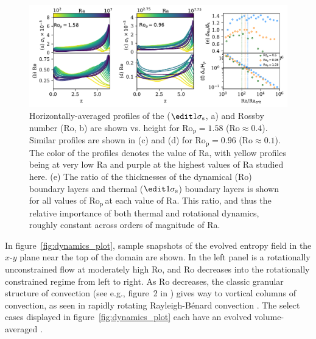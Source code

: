 \documentclass[twocolumn, amsmath, amsfonts, amssymb, trackchanges]{aastex62}
\newcommand{\RB}{Rayleigh-B\'{e}nard }
\newcommand{\pro}{\ensuremath{\text{Ro}_{\text{p}}}}
\begin{document}
\begin{figure}[ht!]
    \includegraphics[width=\textwidth]{boundary_layers.pdf}
    \caption{Horizontally-averaged profiles of the  ($\edit1{\sigma_{\text{s}}}$, a) and Rossby number (Ro, b) 
    are shown vs. height for $\pro = 1.58$ ($\text{Ro} \approx 0.4$). 
    Similar profiles are shown in (c) and (d) for $\pro = 0.96$ ($\text{Ro} \approx 0.1$). The color of the profiles
    denotes the value of Ra, with yellow profiles being at very low Ra and purple at the highest
    values of Ra studied here.
    (e) The ratio of the thicknesses of the dynamical (Ro) boundary layers and 
    thermal ($\edit1{\sigma_{\text{s}}}$) boundary layers is shown for all values of \pro$\,$at each value of Ra.
    This ratio, and thus the relative importance of both thermal and rotational dynamics,
	 roughly constant across orders of magnitude of Ra.
    \label{fig:profiles_and_bls} }
\end{figure}

In figure~\ref{fig:dynamics_plot}, sample snapshots
of the evolved entropy field in the $x$-$y$ plane near the top of the domain are shown. 
In the left panel is a rotationally unconstrained flow at moderately high
Ro, and Ro decreases into the rotationally constrained regime from left to right.
As Ro decreases, the
classic granular structure of convection (see e.g., figure~2 in \AB) gives way to vortical
columns of convection, as seen in rapidly rotating \RB convection \citep{stellmach&all2014}.
The select cases displayed in figure~\ref{fig:dynamics_plot} each have an evolved volume-averaged
.
\end{document}
